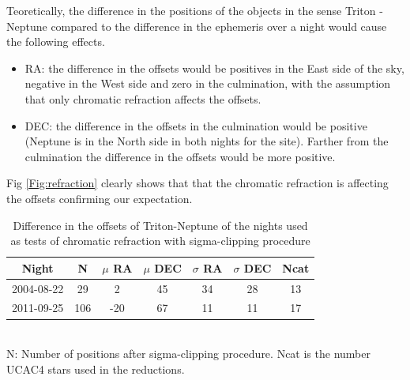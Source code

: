 \documentclass[12pt,a4paper]{report}
\begin{document}
Teoretically, the difference in the positions of the objects in the sense Triton - Neptune compared to the difference in the ephemeris over a night would cause the following effects.

\begin{itemize}
\item RA: the difference in the offsets would be positives in the East side of the sky, negative in the West side and zero in the culmination, with the assumption that only chromatic refraction affects the offsets.
\item DEC: the difference in the offsets in the culmination would be positive (Neptune is in the North side in both nights for the site). Farther from the culmination the difference in the offsets would be more positive.
\end{itemize}

Fig \ref{Fig:refraction} clearly shows that that the chromatic refraction is affecting the offsets confirming our expectation.


\begin{table}[h]
\centering
\caption{Difference in the offsets of Triton-Neptune of the nights used as tests of chromatic refraction with sigma-clipping procedure}
\label{Tab:dados}
\begin{tabular}{|c|c|c|c|c|c|c|}
\hline 
Night & N & $\mu$ RA & $\mu$ DEC & $\sigma$ RA & $\sigma$ DEC & Ncat\\
\hline
2004-08-22 & 29 & 2 & 45 & 34 & 28 & 13 \\ 
2011-09-25 & 106 & -20 & 67 & 11 & 11 & 17\\
\hline 
\end{tabular}
\\N: Number of positions after sigma-clipping procedure. Ncat is the number UCAC4 stars used in the reductions.
\end{table}
\end{document}
